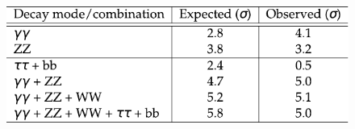 \documentclass[xcolor={usenames,dvipsnames,svgnames,table}]{beamer}
\begin{document}
\begin{frame}
\begin{columns}
\begin{column}{0.49\textwidth}
\begin{figure}[t]
		\end{figure}
		\begin{figure}[t]
			\includegraphics[width=1.\textwidth]{plots/higgs_pvalue_table.pdf}
		\end{figure}
	\end{column}
	\end{columns}
\end{frame}
\end{document}
